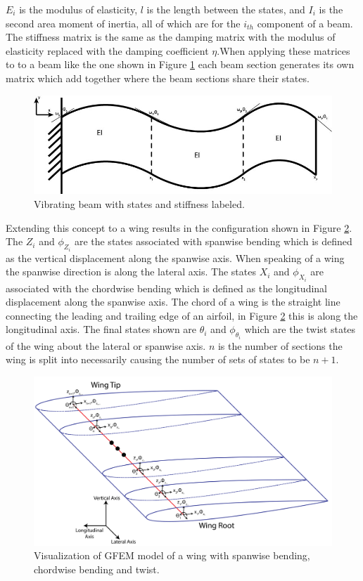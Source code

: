 \documentclass[11pt]{ucthesis}
\begin{document}
$E_i$ is the modulus of elasticity, $l$ is the length between the states, and $I_i$ is the second area moment of inertia, all of which are for the $i_{th}$ component of a beam. The stiffness matrix is the same as the damping matrix with the modulus of elasticity replaced with the damping coefficient $\eta$.When applying these matrices to to a beam like the one shown in Figure \ref{fig:Beam} each beam section generates its own matrix which add together where the beam sections share their states.
\begin{figure}[thpb]
\centering
\includegraphics[width=.6\linewidth]{Figures/Beam.jpg}
\caption{Vibrating beam with states and stiffness labeled.}
\label{fig:Beam} 
\end{figure}
Extending this concept to a wing results in the configuration shown in Figure \ref{fig:CutWing}. The $Z_i$ and $\phi_{Z_i}$ are the states associated with spanwise bending which is defined as the vertical displacement along the spanwise axis. When speaking of a wing the spanwise direction is along the lateral axis. The states $X_i$ and $\phi_{X_i}$ are associated with the chordwise bending which is defined as the longitudinal displacement along the spanwise axis. The chord of a wing is the straight line connecting the leading and trailing edge of an airfoil, in Figure \ref{fig:CutWing} this is along the longitudinal axis. The final states shown are $\theta_i$ and $\phi_{\theta_i}$ which are the twist states of the wing about the lateral or spanwise axis. $n$ is the number of sections the wing is split into necessarily causing the number of sets of states to be $n+1$.
\begin{figure}[thpb]
\centering
\includegraphics[width=1\linewidth]{Figures/StructuralWingStates-01.png}
\caption{Visualization of GFEM model of a wing with spanwise bending, chordwise bending and twist.}
\label{fig:CutWing} 
\end{figure}
\end{document}
